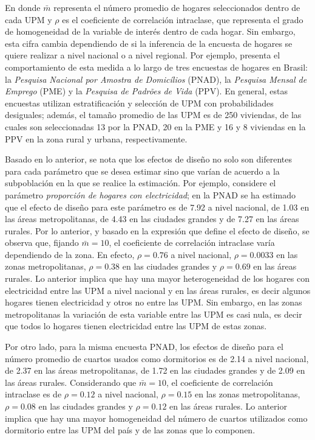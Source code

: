 \documentclass[
  10pt,
  spanish,
]{book}
\begin{document}
En donde \(\bar{m}\) representa el número promedio de hogares seleccionados dentro de cada UPM y \(\rho\) es el coeficiente de correlación intraclase, que representa el grado de homogeneidad de la variable de interés dentro de cada hogar. Sin embargo, esta cifra cambia dependiendo de si la inferencia de la encuesta de hogares se quiere realizar a nivel nacional o a nivel regional. Por ejemplo, \citet[capítulo 7]{United_Nations_2005} presenta el comportamiento de esta medida a lo largo de tres encuestas de hogares en Brasil: la \emph{Pesquisa Nacional por Amostra de Domicílios} (PNAD), la \emph{Pesquisa Mensal de Emprego} (PME) y la \emph{Pesquisa de Padrões de Vida} (PPV). En general, estas encuestas utilizan estratificación y selección de UPM con probabilidades desiguales; además, el tamaño promedio de las UPM es de 250 viviendas, de las cuales son seleccionadas 13 por la PNAD, 20 en la PME y 16 y 8 viviendas en la PPV en la zona rural y urbana, respectivamente.

Basado en lo anterior, se nota que los efectos de diseño no solo son diferentes para cada parámetro que se desea estimar sino que varían de acuerdo a la subpoblación en la que se realice la estimación. Por ejemplo, considere el parámetro \emph{proporción de hogares con electricidad}; en la PNAD se ha estimado que el efecto de diseño para este parámetro es de 7.92 a nivel nacional, de 1.03 en las áreas metropolitanas, de 4.43 en las ciudades grandes y de 7.27 en las áreas rurales. Por lo anterior, y basado en la expresión que define el efecto de diseño, se observa que, fijando \(\bar{m}=10\), el coeficiente de correlación intraclase varía dependiendo de la zona. En efecto, \(\rho= 0.76\) a nivel nacional, \(\rho= 0.0033\) en las zonas metropolitanas, \(\rho= 0.38\) en las ciudades grandes y \(\rho= 0.69\) en las áreas rurales. Lo anterior implica que hay una mayor heterogeneidad de los hogares con electricidad entre las UPM a nivel nacional y en las áreas rurales, es decir algunos hogares tienen electricidad y otros no entre las UPM. Sin embargo, en las zonas metropolitanas la variación de esta variable entre las UPM es casi nula, es decir que todos lo hogares tienen electricidad entre las UPM de estas zonas.

Por otro lado, para la misma encuesta PNAD, los efectos de diseño para el número promedio de cuartos usados como dormitorios es de 2.14 a nivel nacional, de 2.37 en las áreas metropolitanas, de 1.72 en las ciudades grandes y de 2.09 en las áreas rurales. Considerando que \(\bar{m}=10\), el coeficiente de correlación intraclase es de \(\rho= 0.12\) a nivel nacional, \(\rho= 0.15\) en las zonas metropolitanas, \(\rho= 0.08\) en las ciudades grandes y \(\rho= 0.12\) en las áreas rurales. Lo anterior implica que hay una mayor homogeneidad del número de cuartos utilizados como dormitorio entre las UPM del país y de las zonas que lo componen.
\end{document}
